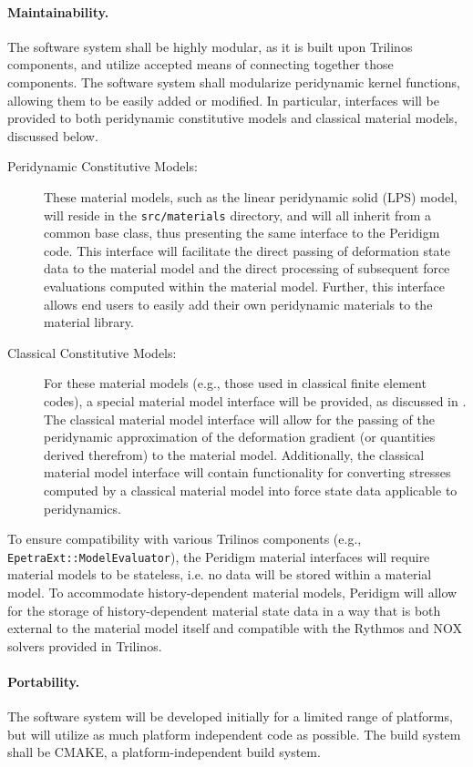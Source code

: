 \documentclass[10pt]{article}
\theoremstyle{plain}
\theoremstyle{definition}
\begin{document}
\paragraph{Maintainability.} The software system shall be highly modular, as it is built upon Trilinos components, and utilize accepted means of connecting together those components. The software system shall modularize peridynamic kernel functions, allowing them to be easily added or modified. In particular, interfaces will be provided to both peridynamic constitutive models and classical material models, discussed below.
\begin{description}
  \item[Peridynamic Constitutive Models:] These material models, such as the linear peridynamic solid (LPS) model, will reside in the \verb"src/materials" directory, and will all inherit from a common base class, thus presenting the same interface to the Peridigm code. This interface will facilitate the direct passing of deformation state data to the material model and the direct processing of subsequent force evaluations computed within the material model. Further, this interface allows end users to easily add their own peridynamic materials to the material library.
  \item[Classical Constitutive Models:] For these material models (e.g., those used in classical finite element codes), a special material model interface will be provided, as discussed in \cite{Silling:2007:PDStates}. The classical material model interface will allow for the passing of the peridynamic approximation of the deformation gradient (or quantities derived therefrom) to the material model. Additionally, the classical material model interface will contain functionality for converting stresses computed by a classical material model into force state data applicable to peridynamics.
\end{description}
To ensure compatibility with various Trilinos components (e.g., \verb"EpetraExt::ModelEvaluator"), the Peridigm material interfaces will require material models to be stateless, i.e. no data will be stored within a material model.  To accommodate history-dependent material models, Peridigm will allow for the storage of history-dependent material state data in a way that is both external to the material model itself and compatible with the Rythmos and NOX solvers provided in Trilinos.

\paragraph{Portability.} The software system will be developed initially for a limited range of platforms, but will utilize as much platform independent code as possible. The build system shall be CMAKE, a platform-independent build system.
\end{document}
